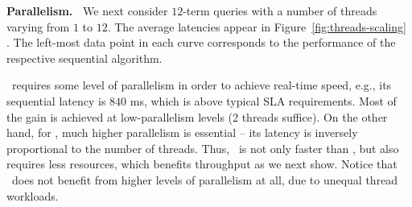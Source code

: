 {{%
{\bf Parallelism.\ } 
We next consider  $12$-term queries with a number of threads varying from $1$ to $12$. 
The average latencies appear in Figure~\ref{fig:threads-scaling}
.  
The left-most data point in each curve corresponds to the performance of 
the respective sequential algorithm.

\alg\ requires some level of parallelism in order to achieve real-time speed, e.g., its sequential
latency 
is $840$ ms, which is  above typical SLA requirements. Most of the gain is achieved at low-parallelism levels (2 threads suffice). 
On the other hand, for \pBMW, much higher parallelism is essential -- its latency is inversely proportional to the number of threads. Thus, \alg\ is not only faster 
than \pBMW, but also requires less resources, which benefits throughput as we next show.
Notice that \pJASS\ does not benefit from higher levels of parallelism at all, due to unequal thread workloads.

}}
